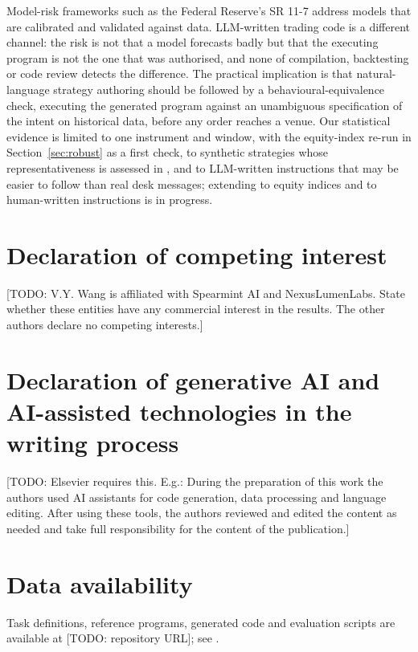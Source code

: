 \documentclass[a4paper,fleqn]{cas-sc}
\newcommand{\todo}[1]{{\color{red}[TODO: #1]}}
\begin{document}
Model-risk frameworks such as the Federal Reserve's SR 11-7 \citep{fed2011sr117} address models that are calibrated and validated against data. LLM-written trading code is a different channel: the risk is not that a model forecasts badly but that the executing program is not the one that was authorised, and none of compilation, backtesting or code review detects the difference. The practical implication is that natural-language strategy authoring should be followed by a behavioural-equivalence check, executing the generated program against an unambiguous specification of the intent on historical data, before any order reaches a venue. Our statistical evidence is limited to one instrument and window, with the equity-index re-run in Section~\ref{sec:robust} as a first check, to synthetic strategies whose representativeness is assessed in \citet{wang2026minteval}, and to LLM-written instructions that may be easier to follow than real desk messages; extending to equity indices and to human-written instructions is in progress.

\section*{Declaration of competing interest}
\todo{V.Y. Wang is affiliated with Spearmint AI and NexusLumenLabs. State whether these entities have any commercial interest in the results. The other authors declare no competing interests.}

\section*{Declaration of generative AI and AI-assisted technologies in the writing process}
\todo{Elsevier requires this. E.g.: During the preparation of this work the authors used AI assistants for code generation, data processing and language editing. After using these tools, the authors reviewed and edited the content as needed and take full responsibility for the content of the publication.}

\section*{Data availability}
Task definitions, reference programs, generated code and evaluation scripts are available at \todo{repository URL}; see \citet{wang2026minteval}.

\printcredits



\end{document}
